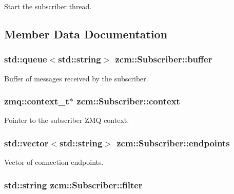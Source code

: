 Start the subscriber thread. 



\subsection{Member Data Documentation}
\hypertarget{classzcm_1_1Subscriber_a0f4c8918c98ebfdebfd46a21d6794a0b}{
\subsubsection[{buffer}]{\setlength{\rightskip}{0pt plus 5cm}std\-::queue$<$std\-::string$>$ zcm\-::\-Subscriber\-::buffer\hspace{0.3cm}{\ttfamily [private]}}}\label{classzcm_1_1Subscriber_a0f4c8918c98ebfdebfd46a21d6794a0b}


Buffer of messages received by the subscriber. 

\hypertarget{classzcm_1_1Subscriber_a271ab3c945d1d3a84551bdca5e50f83f}{
\subsubsection[{context}]{\setlength{\rightskip}{0pt plus 5cm}zmq\-::context\-\_\-t$\ast$ zcm\-::\-Subscriber\-::context\hspace{0.3cm}{\ttfamily [private]}}}\label{classzcm_1_1Subscriber_a271ab3c945d1d3a84551bdca5e50f83f}


Pointer to the subscriber Z\-M\-Q context. 

\hypertarget{classzcm_1_1Subscriber_a81590d7017038d6f50073baaa485a1b7}{
\subsubsection[{endpoints}]{\setlength{\rightskip}{0pt plus 5cm}std\-::vector$<$std\-::string$>$ zcm\-::\-Subscriber\-::endpoints\hspace{0.3cm}{\ttfamily [private]}}}\label{classzcm_1_1Subscriber_a81590d7017038d6f50073baaa485a1b7}


Vector of connection endpoints. 

\hypertarget{classzcm_1_1Subscriber_a28ab0921d97bc4d05ac6bb64c977cc35}{
\subsubsection[{filter}]{\setlength{\rightskip}{0pt plus 5cm}std\-::string zcm\-::\-Subscriber\-::filter\hspace{0.3cm}{\ttfamily [private]}}}\label{classzcm_1_1Subscriber_a28ab0921d97bc4d05ac6bb64c977cc35}


